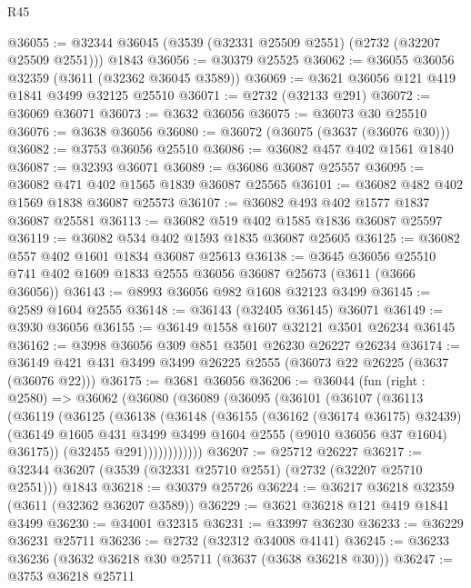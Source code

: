 \begin{lexlean}{R45}
\begin{coremodule}
@36055 := @32344 @36045 (@3539 (@32331 @25509 @2551) (@2732 (@32207 @25509 @2551))) @1843
@36056 := @30379 @25525
@36062 := @36055 @36056 @32359 (@3611 (@32362 @36045 @3589))
@36069 := @3621 @36056 @121 @419 @1841 @3499 @32125 @25510
@36071 := @2732 (@32133 @291)
@36072 := @36069 @36071
@36073 := @3632 @36056
@36075 := @36073 @30 @25510
@36076 := @3638 @36056
@36080 := @36072 (@36075 (@3637 (@36076 @30)))
@36082 := @3753 @36056 @25510
@36086 := @36082 @457 @402 @1561 @1840
@36087 := @32393 @36071
@36089 := @36086 @36087 @25557
@36095 := @36082 @471 @402 @1565 @1839 @36087 @25565
@36101 := @36082 @482 @402 @1569 @1838 @36087 @25573
@36107 := @36082 @493 @402 @1577 @1837 @36087 @25581
@36113 := @36082 @519 @402 @1585 @1836 @36087 @25597
@36119 := @36082 @534 @402 @1593 @1835 @36087 @25605
@36125 := @36082 @557 @402 @1601 @1834 @36087 @25613
@36138 := @3645
    @36056
    @25510
    @741
    @402
    @1609
    @1833
    @2555
    @36056
    @36087
    @25673
    (@3611 (@3666 @36056))
@36143 := @8993 @36056 @982 @1608 @32123 @3499
@36145 := @2589 @1604 @2555
@36148 := @36143 (@32405 @36145) @36071
@36149 := @3930 @36056
@36155 := @36149 @1558 @1607 @32121 @3501 @26234 @36145
@36162 := @3998 @36056 @309 @851 @3501 @26230 @26227 @26234
@36174 := @36149 @421 @431 @3499 @3499 @26225 @2555 (@36073 @22 @26225 (@3637 (@36076 @22)))
@36175 := @3681 @36056
@36206 := @36044
    (fun (right : @2580) =>
    @36062
      (@36080
        (@36089
          (@36095
            (@36101
              (@36107
                (@36113
                  (@36119
                    (@36125
                      (@36138
                        (@36148
                          (@36155
                            (@36162 (@36174 @36175) @32439)
                            (@36149
                              @1605
                              @431
                              @3499
                              @3499
                              @1604
                              @2555
                              (@9010 @36056 @37 @1604)
                              @36175))
                          (@32455 @291))))))))))))
@36207 := @25712 @26227
@36217 := @32344 @36207 (@3539 (@32331 @25710 @2551) (@2732 (@32207 @25710 @2551))) @1843
@36218 := @30379 @25726
@36224 := @36217 @36218 @32359 (@3611 (@32362 @36207 @3589))
@36229 := @3621 @36218 @121 @419 @1841 @3499
@36230 := @34001 @32315
@36231 := @33997 @36230
@36233 := @36229 @36231 @25711
@36236 := @2732 (@32312 @34008 @4141)
@36245 := @36233 @36236 (@3632 @36218 @30 @25711 (@3637 (@3638 @36218 @30)))
@36247 := @3753 @36218 @25711

\end{coremodule}
\end{lexlean}
